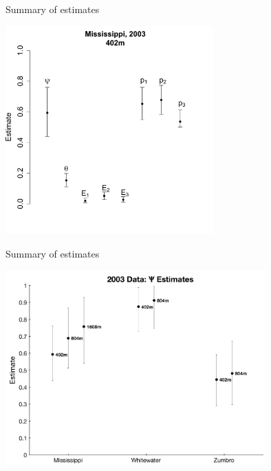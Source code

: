 \documentclass{beamer}
\begin{document}
\begin{frame}{Summary of estimates}
	\begin{center}
		\includegraphics[width=8cm]{Figures/R/MissResults.pdf}
	\end{center}
\end{frame}

\begin{frame}{Summary of estimates}
	\begin{center}
		\includegraphics[width=10cm]{Figures/Graphs/2003Psi.pdf}
	\end{center}
\end{frame}
\end{document}
